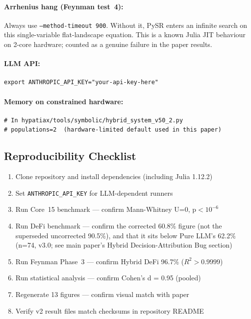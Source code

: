 \documentclass[twoside,11pt]{article}
\begin{document}
\paragraph{Arrhenius hang (Feynman test~4):}
Always use \texttt{--method-timeout 900}. Without it, PySR enters an
infinite search on this single-variable flat-landscape equation.
This is a known Julia JIT behaviour on 2-core hardware; counted as a
genuine failure in the paper results.

\paragraph{LLM API:}
\begin{small}
\begin{verbatim}
export ANTHROPIC_API_KEY="your-api-key-here"
\end{verbatim}
\end{small}

\paragraph{Memory on constrained hardware:}
\begin{small}
\begin{verbatim}
# In hypatiax/tools/symbolic/hybrid_system_v50_2.py
# populations=2  (hardware-limited default used in this paper)
\end{verbatim}
\end{small}

\subsection{Reproducibility Checklist}

\begin{enumerate}
\item Clone repository and install dependencies (including Julia 1.12.2)
\item Set \texttt{ANTHROPIC\_API\_KEY} for LLM-dependent runners
\item Run Core~15 benchmark — confirm Mann-Whitney U=0, p$<10^{-6}$
\item Run DeFi benchmark --- confirm the corrected 60.8\% figure (not the
  superseded uncorrected 90.5\%), and that it sits below Pure LLM's
  62.2\% (n=74, v3.0; see main paper's Hybrid Decision-Attribution Bug
  section)
\item Run Feynman Phase~3 — confirm Hybrid DeFi 96.7\% ($R^2>0.9999$)
\item Run statistical analysis — confirm Cohen's d = 0.95 (pooled)
\item Regenerate 13 figures — confirm visual match with paper
\item Verify v2 result files match checksums in repository README
\end{enumerate}
\end{document}
